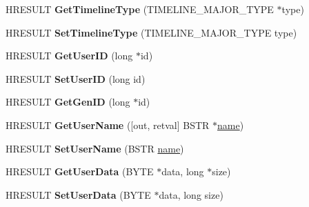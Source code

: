 \begin{DoxyCompactItemize}
H\+R\+E\+S\+U\+LT {\bfseries Get\+Timeline\+Type} (T\+I\+M\+E\+L\+I\+N\+E\+\_\+\+M\+A\+J\+O\+R\+\_\+\+T\+Y\+PE $\ast$type)
\item 
\mbox{\label{interface_i_a_m_timeline_obj_a0f78327514e3f31702350c6f005997a2}} 
H\+R\+E\+S\+U\+LT {\bfseries Set\+Timeline\+Type} (T\+I\+M\+E\+L\+I\+N\+E\+\_\+\+M\+A\+J\+O\+R\+\_\+\+T\+Y\+PE type)
\item 
\mbox{\label{interface_i_a_m_timeline_obj_ac0206966e9fb6cd9e208d0559b37d9b0}} 
H\+R\+E\+S\+U\+LT {\bfseries Get\+User\+ID} (long $\ast$id)
\item 
\mbox{\label{interface_i_a_m_timeline_obj_a5ffa7a93f07336b516f56e8c784d5ef1}} 
H\+R\+E\+S\+U\+LT {\bfseries Set\+User\+ID} (long id)
\item 
\mbox{\label{interface_i_a_m_timeline_obj_a6ed5d9436b1f70e1507b14bb606d1f04}} 
H\+R\+E\+S\+U\+LT {\bfseries Get\+Gen\+ID} (long $\ast$id)
\item 
\mbox{\label{interface_i_a_m_timeline_obj_a6e098c495bb23744111397b02c341c5d}} 
H\+R\+E\+S\+U\+LT {\bfseries Get\+User\+Name} (\mbox{[}out, retval\mbox{]} B\+S\+TR $\ast$\hyperlink{structname}{name})
\item 
\mbox{\label{interface_i_a_m_timeline_obj_aa432b2d74f8f083c1d70639b4cc326e5}} 
H\+R\+E\+S\+U\+LT {\bfseries Set\+User\+Name} (B\+S\+TR \hyperlink{structname}{name})
\item 
\mbox{\label{interface_i_a_m_timeline_obj_acd942d2a61e31da34c6b3d3fb29885a8}} 
H\+R\+E\+S\+U\+LT {\bfseries Get\+User\+Data} (B\+Y\+TE $\ast$data, long $\ast$size)
\item 
\mbox{\label{interface_i_a_m_timeline_obj_a925cce59aa79b2f155e3f9a84b1bc6ff}} 
H\+R\+E\+S\+U\+LT {\bfseries Set\+User\+Data} (B\+Y\+TE $\ast$data, long size)
\item 
\mbox{\label{interface_i_a_m_timeline_obj_a32eb4082bb5c405db3ae321248887702}} 

\end{DoxyCompactItemize}
